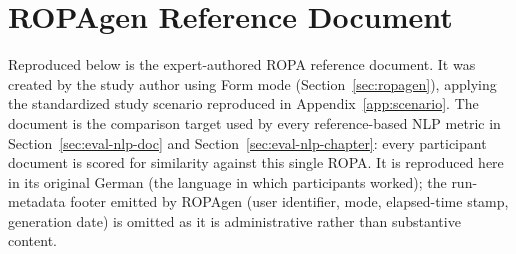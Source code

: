 \section{ROPAgen Reference Document}
\label{app:ropagen-reference}

Reproduced below is the expert-authored ROPA reference document. It was created by the study author using Form mode (Section~\ref{sec:ropagen}), applying the standardized study scenario reproduced in Appendix~\ref{app:scenario}. The document is the comparison target used by every reference-based NLP metric in Section~\ref{sec:eval-nlp-doc} and Section~\ref{sec:eval-nlp-chapter}: every participant document is scored for similarity against this single ROPA. It is reproduced here in its original German (the language in which participants worked); the run-metadata footer emitted by ROPAgen (user identifier, mode, elapsed-time stamp, generation date) is omitted as it is administrative rather than substantive content.

